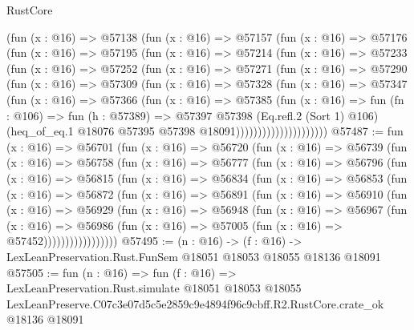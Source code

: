 \begin{lexlean}{RustCore}
\begin{coremodule}
              (fun (x : @16) =>
              @57138
                (fun (x : @16) =>
                @57157
                  (fun (x : @16) =>
                  @57176
                    (fun (x : @16) =>
                    @57195
                      (fun (x : @16) =>
                      @57214
                        (fun (x : @16) =>
                        @57233
                          (fun (x : @16) =>
                          @57252
                            (fun (x : @16) =>
                            @57271
                              (fun (x : @16) =>
                              @57290
                                (fun (x : @16) =>
                                @57309
                                  (fun (x : @16) =>
                                  @57328
                                    (fun (x : @16) =>
                                    @57347
                                      (fun (x : @16) =>
                                      @57366
                                        (fun (x : @16) =>
                                        @57385
                                          (fun (x : @16) =>
                                          fun (fn : @106) =>
                                          fun (h : @57389) =>
                                          @57397
                                            @57398
                                            (Eq.refl.{2} (Sort 1) @106)
                                            (heq_of_eq.{1}
                                              @18076
                                              @57395
                                              @57398
                                              @18091)))))))))))))))))))))
@57487 := fun (x : @16) =>
  @56701
    (fun (x : @16) =>
    @56720
      (fun (x : @16) =>
      @56739
        (fun (x : @16) =>
        @56758
          (fun (x : @16) =>
          @56777
            (fun (x : @16) =>
            @56796
              (fun (x : @16) =>
              @56815
                (fun (x : @16) =>
                @56834
                  (fun (x : @16) =>
                  @56853
                    (fun (x : @16) =>
                    @56872
                      (fun (x : @16) =>
                      @56891
                        (fun (x : @16) =>
                        @56910
                          (fun (x : @16) =>
                          @56929
                            (fun (x : @16) =>
                            @56948
                              (fun (x : @16) =>
                              @56967
                                (fun (x : @16) =>
                                @56986
                                  (fun (x : @16) => @57005 (fun (x : @16) => @57452)))))))))))))))))
@57495 := (n : @16) ->
  (f : @16) -> LexLeanPreservation.Rust.FunSem @18051 @18053 @18055 @18136 @18091
@57505 := fun (n : @16) =>
  fun (f : @16) =>
  LexLeanPreservation.Rust.simulate
    @18051
    @18053
    @18055
    LexLeanPreserve.C07c3e07d5c5e2859c9e4894f96c9cbff.R2.RustCore.crate_ok
    @18136
    @18091
\end{coremodule}
\end{lexlean}
